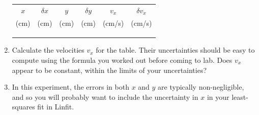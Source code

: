\begin{enumerate}
\begin{center}
\begin{tabular}{|c|c|c|c|c|c|}
\hline
$x$ & $\delta x$& $y$ & $\delta y$& $v_{x}$ & $\delta v_{x}$ \\
 (cm) & (cm)   &  (cm)& (cm)      & (cm/s) &  (cm/s)\\
\hline
 \phantom{10000}& \phantom{10000}   &  \phantom{10000}& \phantom{10000}      & \phantom{10000} &  \phantom{10000} \\
\hline
  &   &  &  &  &      \\ \hline
  &   &  &  &  &      \\ \hline
\end{tabular}
\end{center}
\item Calculate the velocities $v_{x}$ for the table.  Their uncertainties
should be easy to compute using the formula you worked out before coming to
lab.  Does $v_{x}$ appear to be constant, within the limits of your uncertainties?


\item  In this experiment, the errors in both $x$ and $y$ are
typically non-negligible, and so you will probably want to
include the uncertainty in $x$ in your least-squares fit in Linfit.



\end{enumerate}

